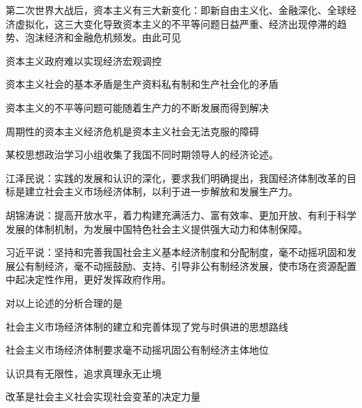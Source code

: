\documentclass{exam-zh}
\newenvironment{kaiti-indented}{
  \parindent=2em %
  \CJKfamily{zhkai} %
}{
}
\begin{document}
\begin{question}
第二次世界大战后，资本主义有三大新变化：即新自由主义化、金融深化、全球经济虚拟化，这三大变化导致资本主义的不平等问题日益严重、经济出现停滞的趋势、泡沫经济和金融危机频发。由此可见

 资本主义政府难以实现经济宏观调控

 资本主义社会的基本矛盾是生产资料私有制和生产社会化的矛盾

 资本主义的不平等问题可能随着生产力的不断发展而得到解决

 周期性的资本主义经济危机是资本主义社会无法克服的障碍

\begin{choices}
\item {}
\item {}
\item {}
\item {}
\end{choices}
\end{question}

\begin{question}
某校思想政治学习小组收集了我国不同时期领导人的经济论述。

\begin{kaiti-indented}
江泽民说：实践的发展和认识的深化，要求我们明确提出，我国经济体制改革的目标是建立社会主义市场经济体制，以利于进一步解放和发展生产力。

胡锦涛说：提高开放水平，着力构建充满活力、富有效率、更加开放、有利于科学发展的体制机制，为发展中国特色社会主义提供强大动力和体制保障。

习近平说：坚持和完善我国社会主义基本经济制度和分配制度，毫不动摇巩固和发展公有制经济，毫不动摇鼓励、支持、引导非公有制经济发展，使市场在资源配置中起决定性作用，更好发挥政府作用。
\end{kaiti-indented}

对以上论述的分析合理的是

 社会主义市场经济体制的建立和完善体现了党与时俱进的思想路线

 社会主义市场经济体制要求毫不动摇巩固公有制经济主体地位

 认识具有无限性，追求真理永无止境

 改革是社会主义社会实现社会变革的决定力量

\begin{choices}
\item {}
\item {}
\item {}
\item {}
\end{choices}
\end{question}
\end{document}
